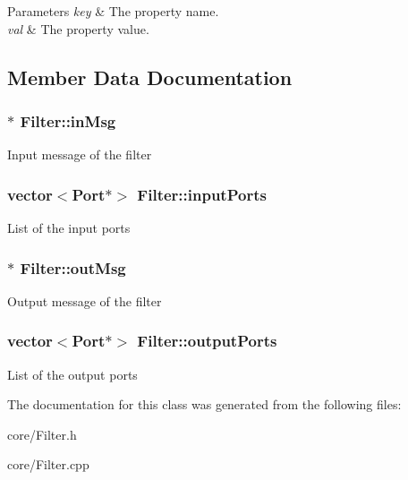 \begin{DoxyParams}{Parameters}
{\em key} & The property name. \\
\hline
{\em val} & The property value. \\
\hline
\end{DoxyParams}


\subsection{Member Data Documentation}
\hypertarget{classFilter_ac938e02933af2dfb267895d260221d92}{
\subsubsection[{in\-Msg}]{$\ast$ Filter\-::in\-Msg\hspace{0.3cm}{\ttfamily [protected]}}}\label{classFilter_ac938e02933af2dfb267895d260221d92}
Input message of the filter \hypertarget{classFilter_ad09f0773f4b96d6f9ac143bb5b046d0b}{
\subsubsection[{input\-Ports}]{\setlength{\rightskip}{0pt plus 5cm}vector$<${\bf Port}$\ast$$>$ Filter\-::input\-Ports\hspace{0.3cm}{\ttfamily [protected]}}}\label{classFilter_ad09f0773f4b96d6f9ac143bb5b046d0b}
List of the input ports \hypertarget{classFilter_a5c1d2a7a7da437769281029505ef3054}{
\subsubsection[{out\-Msg}]{$\ast$ Filter\-::out\-Msg\hspace{0.3cm}{\ttfamily [protected]}}}\label{classFilter_a5c1d2a7a7da437769281029505ef3054}
Output message of the filter \hypertarget{classFilter_abf9b24a29561046ca09c65f5dde427ea}{
\subsubsection[{output\-Ports}]{\setlength{\rightskip}{0pt plus 5cm}vector$<${\bf Port}$\ast$$>$ Filter\-::output\-Ports\hspace{0.3cm}{\ttfamily [protected]}}}\label{classFilter_abf9b24a29561046ca09c65f5dde427ea}
List of the output ports 

The documentation for this class was generated from the following files\-:\begin{DoxyCompactItemize}
\item 
core/Filter.\-h\item 
core/Filter.\-cpp\end{DoxyCompactItemize}
